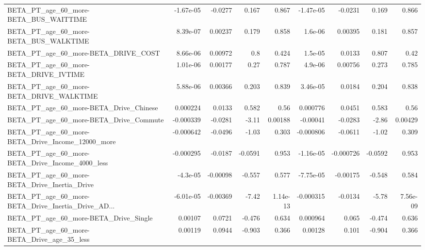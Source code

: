 \begin{tabular}{lrrrrrrrr}
BETA\_PT\_age\_60\_more-BETA\_BUS\_WAITTIME              &   -1.67e-05 &      -0.0277 &    0.167 &    0.867 &  -1.47e-05 &     -0.0231 &        0.169 &         0.866 \\
BETA\_PT\_age\_60\_more-BETA\_BUS\_WALKTIME              &    8.39e-07 &      0.00237 &    0.179 &    0.858 &    1.6e-06 &     0.00395 &        0.181 &         0.857 \\
BETA\_PT\_age\_60\_more-BETA\_DRIVE\_COST                &    8.66e-06 &      0.00972 &      0.8 &    0.424 &    1.5e-05 &      0.0133 &        0.807 &          0.42 \\
BETA\_PT\_age\_60\_more-BETA\_DRIVE\_IVTIME              &    1.01e-06 &      0.00177 &     0.27 &    0.787 &    4.9e-06 &     0.00756 &        0.273 &         0.785 \\
BETA\_PT\_age\_60\_more-BETA\_DRIVE\_WALKTIME            &    5.88e-06 &      0.00366 &    0.203 &    0.839 &   3.46e-05 &      0.0184 &        0.204 &         0.838 \\
BETA\_PT\_age\_60\_more-BETA\_Drive\_Chinese             &    0.000224 &       0.0133 &    0.582 &     0.56 &   0.000776 &      0.0451 &        0.583 &          0.56 \\
BETA\_PT\_age\_60\_more-BETA\_Drive\_Commute             &   -0.000339 &      -0.0281 &    -3.11 &  0.00188 &   -0.00041 &     -0.0283 &        -2.86 &       0.00429 \\
BETA\_PT\_age\_60\_more-BETA\_Drive\_Income\_12000\_more   &   -0.000642 &      -0.0496 &    -1.03 &    0.303 &  -0.000806 &     -0.0611 &        -1.02 &         0.309 \\
BETA\_PT\_age\_60\_more-BETA\_Drive\_Income\_4000\_less    &   -0.000295 &      -0.0187 &  -0.0591 &    0.953 &  -1.16e-05 &   -0.000726 &      -0.0592 &         0.953 \\
BETA\_PT\_age\_60\_more-BETA\_Drive\_Inertia\_Drive       &    -4.3e-05 &     -0.00098 &   -0.557 &    0.577 &  -7.75e-05 &    -0.00175 &       -0.548 &         0.584 \\
BETA\_PT\_age\_60\_more-BETA\_Drive\_Inertia\_Drive\_AD... &   -6.01e-05 &     -0.00369 &    -7.42 & 1.14e-13 &  -0.000315 &     -0.0134 &        -5.78 &      7.56e-09 \\
BETA\_PT\_age\_60\_more-BETA\_Drive\_Single              &     0.00107 &       0.0721 &   -0.476 &    0.634 &   0.000964 &       0.065 &       -0.474 &         0.636 \\
BETA\_PT\_age\_60\_more-BETA\_Drive\_age\_35\_less         &     0.00119 &       0.0944 &   -0.903 &    0.366 &    0.00128 &       0.101 &       -0.904 &         0.366 \\

\end{tabular}
